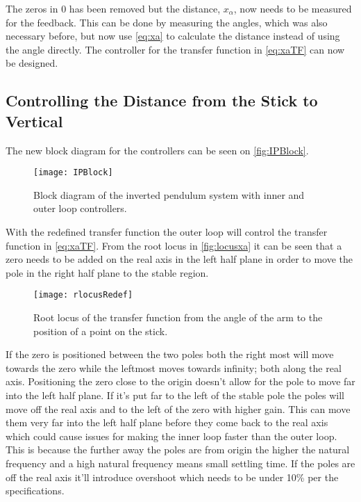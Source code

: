 The zeros in 0 has been removed but the distance, $x_\alpha$, now needs to be measured for the feedback. This can be done by measuring the angles, which was also necessary before, but now use \autoref{eq:xa} to calculate the distance instead of using the angle directly. The controller for the transfer function in \autoref{eq:xaTF} can now be designed.
\subsection{Controlling the Distance from the Stick to Vertical}
%
The new block diagram for the controllers can be seen on \autoref{fig:IPBlock}.
\begin{figure}[htbp]
\centering
\texttt{[image: IPBlock]}
\caption{Block diagram of the inverted pendulum system with inner and outer loop controllers.}
\label{fig:IPBlock}
\end{figure}
%

With the redefined transfer function the outer loop will control the transfer function in \autoref{eq:xaTF}. From the root locus in \autoref{fig:locusxa} it can be seen that a zero needs to be added on the real axis in the left half plane in order to move the pole in the right half plane to the stable region. 

\begin{figure}[htbp]
\centering
\texttt{[image: rlocusRedef]}
\caption{Root locus of the transfer function from the angle of the arm to the position of a point on the stick.}
\label{fig:locusxa}
\end{figure}

If the zero is positioned between the two poles both the right most will move towards the zero while the leftmost moves towards infinity; both along the real axis. Positioning the zero close to the origin doesn't allow for the pole to move far into the left half plane. If it's put far to the left of the stable pole the poles will move off the real axis and to the left of the zero with higher gain. This can move them very far into the left half plane before they come back to the real axis which could cause issues for making the inner loop faster than the outer loop. This is because the further away the poles are from origin the higher the natural frequency and a high natural frequency means small settling time. If the poles are off the real axis it'll introduce overshoot which needs to be under 10\% per the specifications. 


